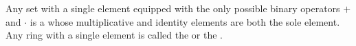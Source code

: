 \begin{definition} \label{definition:zero_ring}
    Any set with a single element equipped with the only possible binary operators $+$ and $\cdot$ is a  whose multiplicative and identity elements are both the sole element. Any ring with a single element is called the  or the .
\end{definition}